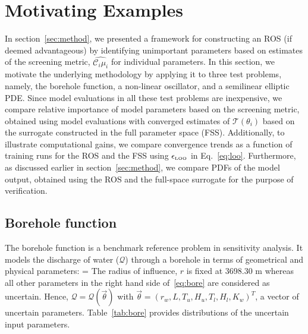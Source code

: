 \section{Motivating Examples}
\label{sec:examples}

In section~\ref{sec:method}, we presented a framework for constructing
an ROS (if deemed advantageous) by identifying unimportant parameters based on 
estimates of the screening metric, $\widehat{\mathcal{C}_i\mu_i}$
for individual parameters.
In this section, we motivate the underlying methodology by applying it to three
test problems,
namely, the borehole function, a non-linear oscillator, and a semilinear elliptic PDE.
Since model evaluations in all these test
problems are inexpensive, we compare relative importance of model parameters based
on the screening metric, obtained using model evaluations with 
converged estimates of $\mathcal{T}(\theta_i)$ based on the surrogate constructed in the
full parameter space (FSS). Additionally, to illustrate computational gains, we compare
convergence trends as a function of training runs for the ROS and the FSS using 
$\epsilon_{\mbox{\tiny LOO}}$ in Eq.~\ref{eq:loo}. 
Furthermore, as discussed earlier in section~\ref{sec:method}, we compare
PDFs of the model output, obtained using the ROS and the full-space surrogate for
the purpose of verification. 

\subsection{Borehole function}

The borehole function is a benchmark reference problem in sensitivity analysis.
It models the discharge of water ($\mathcal{Q}$) through a borehole in terms of
geometrical and physical parameters:
\be
{} = 
\label{eq:bore}
\ee
The radius of influence, $r$ is fixed at 3698.30 m whereas all other parameters
in the right hand side of~\eqref{eq:bore} are considered 
as uncertain. Hence, $\mathcal{Q} = \mathcal{Q}(\vec{\theta})$ with 
 $\vec{\theta} = (r_w, L, T_u, H_u, T_l, H_l, K_w)^T$, a vector of
 uncertain parameters. Table~\ref{tab:bore} provides distributions of the
 uncertain input parameters. 

